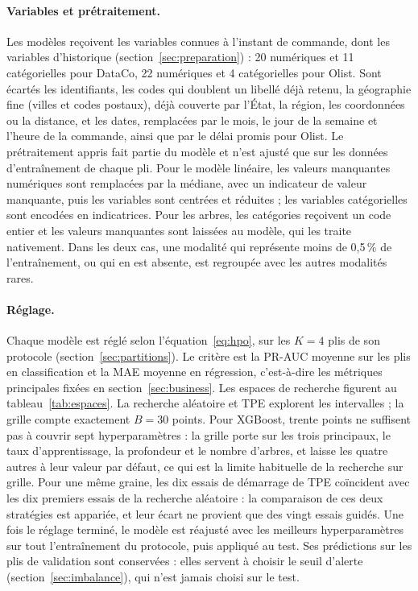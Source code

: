 \documentclass[11pt,a4paper]{article}
\theoremstyle{definition}
\begin{document}
\paragraph{Variables et prétraitement.} Les modèles reçoivent les variables connues à l'instant de commande, dont les variables d'historique (section~\ref{sec:preparation}) : 20 numériques et 11 catégorielles pour DataCo, 22 numériques et 4 catégorielles pour Olist. Sont écartés les identifiants, les codes qui doublent un libellé déjà retenu, la géographie fine (villes et codes postaux), déjà couverte par l'État, la région, les coordonnées ou la distance, et les dates, remplacées par le mois, le jour de la semaine et l'heure de la commande, ainsi que par le délai promis pour Olist. Le prétraitement appris fait partie du modèle et n'est ajusté que sur les données d'entraînement de chaque pli. Pour le modèle linéaire, les valeurs manquantes numériques sont remplacées par la médiane, avec un indicateur de valeur manquante, puis les variables sont centrées et réduites ; les variables catégorielles sont encodées en indicatrices. Pour les arbres, les catégories reçoivent un code entier et les valeurs manquantes sont laissées au modèle, qui les traite nativement. Dans les deux cas, une modalité qui représente moins de 0,5\,\% de l'entraînement, ou qui en est absente, est regroupée avec les autres modalités rares.

\paragraph{Réglage.} Chaque modèle est réglé selon l'équation~\eqref{eq:hpo}, sur les $K = 4$ plis de son protocole (section~\ref{sec:partitions}). Le critère est la PR-AUC moyenne sur les plis en classification et la MAE moyenne en régression, c'est-à-dire les métriques principales fixées en section~\ref{sec:business}. Les espaces de recherche figurent au tableau~\ref{tab:espaces}. La recherche aléatoire et TPE explorent les intervalles ; la grille compte exactement $B = 30$ points. Pour XGBoost, trente points ne suffisent pas à couvrir sept hyperparamètres : la grille porte sur les trois principaux, le taux d'apprentissage, la profondeur et le nombre d'arbres, et laisse les quatre autres à leur valeur par défaut, ce qui est la limite habituelle de la recherche sur grille. Pour une même graine, les dix essais de démarrage de TPE coïncident avec les dix premiers essais de la recherche aléatoire : la comparaison de ces deux stratégies est appariée, et leur écart ne provient que des vingt essais guidés. Une fois le réglage terminé, le modèle est réajusté avec les meilleurs hyperparamètres sur tout l'entraînement du protocole, puis appliqué au test. Ses prédictions sur les plis de validation sont conservées : elles servent à choisir le seuil d'alerte (section~\ref{sec:imbalance}), qui n'est jamais choisi sur le test.
\end{document}
